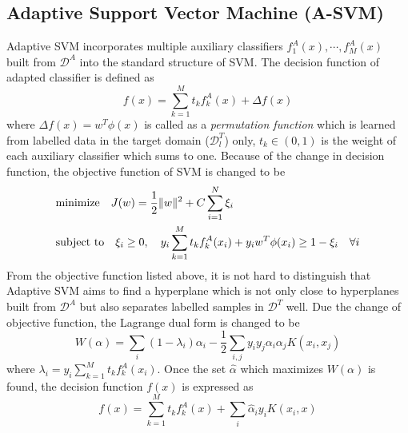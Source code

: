 \subsection{Adaptive Support Vector Machine (A-SVM)}
Adaptive SVM \cite{yang2007cross} incorporates multiple auxiliary classifiers $f_1^A(x), \cdots, f_M^A(x)$ built from $\mathcal{D}^A$ into the standard structure of SVM. The decision function of adapted classifier is defined as
\begin{equation}
f(x) = \sum_{k=1}^M t_k f_{k}^A(x) + \Delta f(x)
\end{equation}
where $\Delta f(x) = w^T \phi(x)$ is called as a {\em permutation function} which is learned from labelled data in the target domain ($\mathcal{D}_l^T$) only, $t_k \in (0, 1)$ is the weight of each auxiliary classifier which sums to one. Because of the change in decision function, the objective function of SVM is changed to be
  \begin{eqnarray}
  & \text{minimize} \quad J(w) = \frac{1}{2} \lVert w \rVert^2 + C \sum_{i=1}^{N}\xi_i  \nonumber \\
  & \text{subject to} \quad \xi_i \ge 0, \quad y_i \sum_{k=1}^M t_k f_{k}^A(x_i) + y_i w^{T} \phi(x_i) \ge 1 - \xi_i \quad \forall i
  \end{eqnarray}
 From the objective function listed above, it is not hard to distinguish that Adaptive SVM aims to find a hyperplane which is not only close to hyperplanes built from $\mathcal{D}^A$ but also separates labelled samples in $\mathcal{D}^T$ well. Due the change of objective function, the Lagrange dual form is changed to be 
  \begin{equation}
  W(\alpha) = \sum_{i} (1 - \lambda_i) \alpha_i - \frac{1}{2} \sum_{i,j} y_i y_j \alpha_i \alpha_j K(x_i, x_j)
  \end{equation}
  where $\lambda_i = y_i \sum_{k=1}^M t_k f_{k}^A(x_i)$. Once the set $\hat \alpha$ which maximizes $W(\alpha)$ is found, the decision function $f(x)$ is expressed as 
 \begin{equation}
f(x) = \sum_{k=1}^M t_k f_{k}^A(x) + \sum_i \hat \alpha_i y_i K(x_i, x)
\end{equation}

